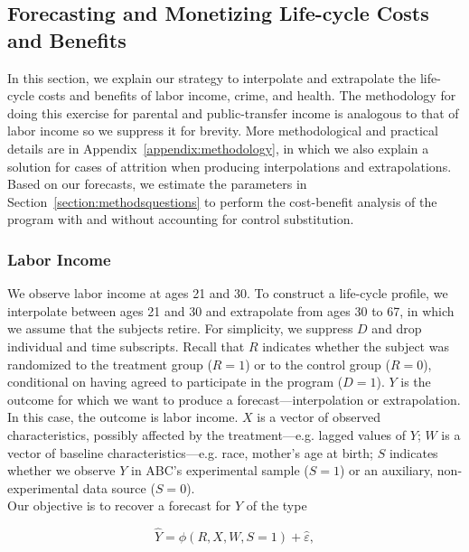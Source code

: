 \subsection{Forecasting and Monetizing Life-cycle Costs and Benefits}

\noindent In this section, we explain our strategy to interpolate and extrapolate the life-cycle costs and benefits of labor income, crime, and health. The methodology for doing this exercise for parental and public-transfer income is analogous to that of labor income so we suppress it for brevity. More methodological and practical details are in Appendix~\ref{appendix:methodology}, in which we also explain a solution for cases of attrition when producing interpolations and extrapolations. Based on our forecasts, we estimate the parameters in Section~\ref{section:methodsquestions} to perform the cost-benefit analysis of the program with and without accounting for control substitution.

\subsubsection{Labor Income}

\noindent We observe labor income at ages 21 and 30. To construct a life-cycle profile, we interpolate between ages 21 and 30 and extrapolate from ages 30 to 67, in which we assume that the subjects retire. For simplicity, we suppress $D$ and drop individual and time subscripts. Recall that $R$ indicates whether the subject was randomized to the treatment group ($R=1$) or to the control group ($R=0$), conditional on having agreed to participate in the program ($D = 1$). $Y$ is the outcome for which we want to produce a forecast---interpolation or extrapolation. In this case, the outcome is labor income. $X$ is a vector of observed characteristics, possibly affected by the treatment---e.g. lagged values of $Y$; $W$ is a vector of baseline characteristics---e.g. race, mother's age at birth; $S$ indicates whether we observe $Y$ in ABC's experimental sample ($S=1$) or an auxiliary, non-experimental data source ($S=0$).\\

\noindent Our objective is to recover a forecast for $Y$ of the type

\begin{equation}
\widehat{Y} = \widehat{\phi} \left( R, X, W, S = 1 \right) + \widehat{\varepsilon},   \label{eq:additive}
\end{equation}

